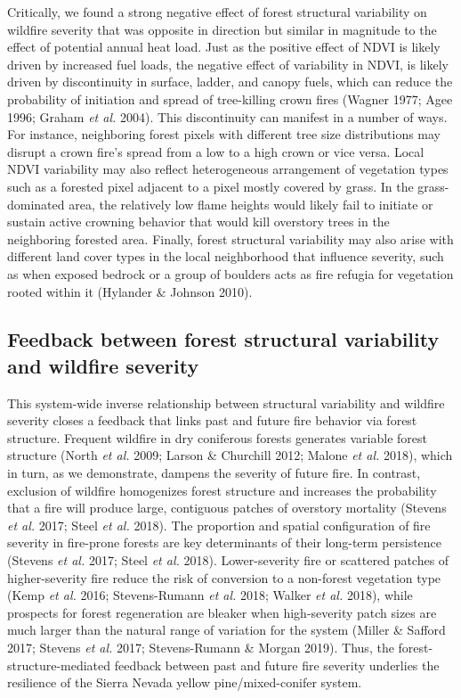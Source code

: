\documentclass[]{article}
\begin{document}
Critically, we found a strong negative effect of forest structural
variability on wildfire severity that was opposite in direction but
similar in magnitude to the effect of potential annual heat load. Just
as the positive effect of NDVI is likely driven by increased fuel loads,
the negative effect of variability in NDVI, is likely driven by
discontinuity in surface, ladder, and canopy fuels, which can reduce the
probability of initiation and spread of tree-killing crown fires (Wagner
1977; Agee 1996; Graham \emph{et al.} 2004). This discontinuity can
manifest in a number of ways. For instance, neighboring forest pixels
with different tree size distributions may disrupt a crown fire's spread
from a low to a high crown or vice versa. Local NDVI variability may
also reflect heterogeneous arrangement of vegetation types such as a
forested pixel adjacent to a pixel mostly covered by grass. In the
grass-dominated area, the relatively low flame heights would likely fail
to initiate or sustain active crowning behavior that would kill
overstory trees in the neighboring forested area. Finally, forest
structural variability may also arise with different land cover types in
the local neighborhood that influence severity, such as when exposed
bedrock or a group of boulders acts as fire refugia for vegetation
rooted within it (Hylander \& Johnson 2010).

\hypertarget{feedback-between-forest-structural-variability-and-wildfire-severity}{%
\subsection{Feedback between forest structural variability and wildfire
severity}\label{feedback-between-forest-structural-variability-and-wildfire-severity}}

This system-wide inverse relationship between structural variability and
wildfire severity closes a feedback that links past and future fire
behavior via forest structure. Frequent wildfire in dry coniferous
forests generates variable forest structure (North \emph{et al.} 2009;
Larson \& Churchill 2012; Malone \emph{et al.} 2018), which in turn, as
we demonstrate, dampens the severity of future fire. In contrast,
exclusion of wildfire homogenizes forest structure and increases the
probability that a fire will produce large, contiguous patches of
overstory mortality (Stevens \emph{et al.} 2017; Steel \emph{et al.}
2018). The proportion and spatial configuration of fire severity in
fire-prone forests are key determinants of their long-term persistence
(Stevens \emph{et al.} 2017; Steel \emph{et al.} 2018). Lower-severity
fire or scattered patches of higher-severity fire reduce the risk of
conversion to a non-forest vegetation type (Kemp \emph{et al.} 2016;
Stevens-Rumann \emph{et al.} 2018; Walker \emph{et al.} 2018), while
prospects for forest regeneration are bleaker when high-severity patch
sizes are much larger than the natural range of variation for the system
(Miller \& Safford 2017; Stevens \emph{et al.} 2017; Stevens-Rumann \&
Morgan 2019). Thus, the forest-structure-mediated feedback between past
and future fire severity underlies the resilience of the Sierra Nevada
yellow pine/mixed-conifer system.
\end{document}
